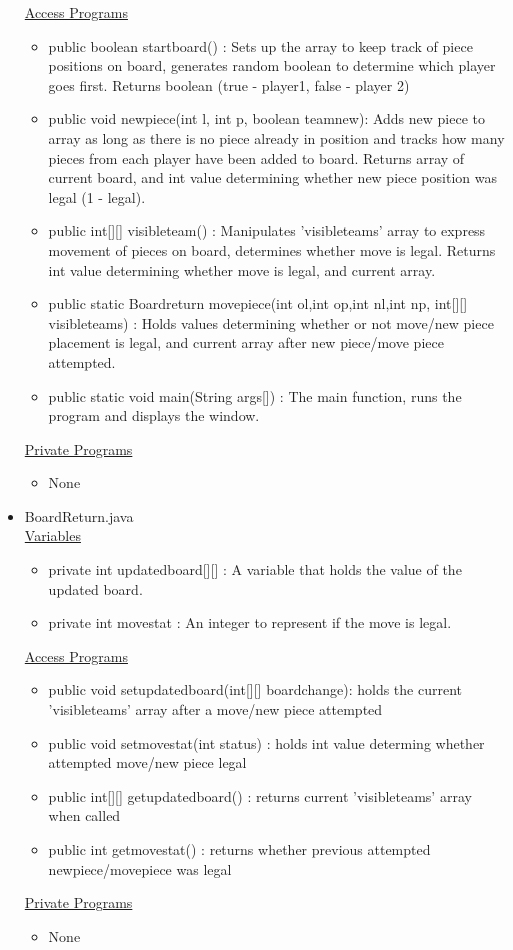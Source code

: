 \documentclass[12pt]{article}
\begin{document}
\begin{itemize}
\begin{itemize}
\end{itemize}
\underline{Access Programs}
\begin{itemize}
	\item public boolean startboard() : Sets up the array to keep track of piece positions on board, generates random boolean to determine which player goes first. Returns boolean (true - player1, false - player 2)
	\item public void newpiece(int l, int p, boolean teamnew): Adds new piece to array as long as there is no piece already in position and tracks how many pieces from each player have been added to board. Returns array of current board, and int value determining whether new piece position was legal (1 - legal).
	\item public int[][] visibleteam() : Manipulates 'visibleteams' array to express movement of pieces on board, determines whether move is legal. Returns int value determining whether move is legal, and current array.
	\item public static Boardreturn movepiece(int ol,int op,int nl,int np, int[][] visibleteams) : Holds values determining whether or not move/new piece placement is legal, and current array after new piece/move piece attempted. 
	\item public static void main(String args[]) : The main function, runs the program and displays the window.

\end{itemize}
\underline{Private Programs}
\begin{itemize}
	\item None
			
\end{itemize}	

	\item BoardReturn.java \\
	\underline{Variables}
	\begin{itemize}
		\item private int updatedboard[][] : A variable that holds the value of the updated board.
		\item private int movestat : An integer to represent if the move is legal.

	\end{itemize}
	\underline{Access Programs}
	\begin{itemize}
					\item public void setupdatedboard(int[][] boardchange): holds the current 'visibleteams' array after a move/new piece attempted 
					\item public void setmovestat(int status) : holds int value determing whether attempted move/new piece legal
					\item public int[][] getupdatedboard() : returns current 'visibleteams' array when called
					\item public int getmovestat() : returns whether previous attempted newpiece/movepiece was legal
	\end{itemize}
	\underline{Private Programs}
	\begin{itemize}
		\item None
		

\end{itemize}
\end{itemize}
\end{document}

